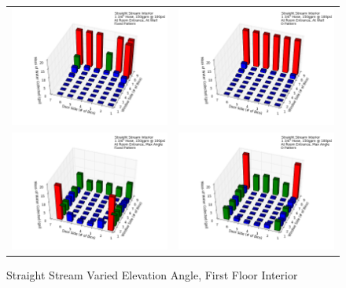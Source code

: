 \documentclass{article}
\begin{document}
\begin{appendices}
\begin{figure}[ht]
\begin{tabular*}{\textwidth}{lr}
\includegraphics[width=3.2in]{../ADD_Analysis/Figures/15-12-09_151401_Datafile_Straight_Stream_Interior.png} &
\includegraphics[width=3.2in]{../ADD_Analysis/Figures/15-12-09_151823_Datafile_Straight_Stream_Interior.png} \\
\includegraphics[width=3.2in]{../ADD_Analysis/Figures/15-12-09_152435_Datafile_Straight_Stream_Interior.png} &
\includegraphics[width=3.2in]{../ADD_Analysis/Figures/15-12-09_153038_Datafile_Straight_Stream_Interior.png} \\
\end{tabular*}
\caption{Straight Stream Varied Elevation Angle, First Floor Interior}
\label{fig:Straight Stream Varied Elevation Angle, First Floor Interior}
\end{figure}

\clearpage

\end{appendices}
\end{document}
